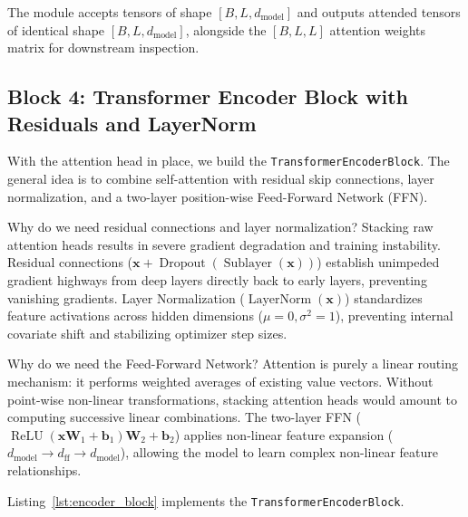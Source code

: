\documentclass[11pt,a4paper]{article}
\begin{document}
The module accepts tensors of shape $[B, L, d_{\text{model}}]$ and outputs attended tensors of identical shape $[B, L, d_{\text{model}}]$, alongside the $[B, L, L]$ attention weights matrix for downstream inspection.

\subsection{Block 4: Transformer Encoder Block with Residuals and LayerNorm}

With the attention head in place, we build the \texttt{TransformerEncoderBlock}. The general idea is to combine self-attention with residual skip connections, layer normalization, and a two-layer position-wise Feed-Forward Network (FFN).

Why do we need residual connections and layer normalization? Stacking raw attention heads results in severe gradient degradation and training instability. Residual connections ($\mathbf{x} + \operatorname{Dropout}(\operatorname{Sublayer}(\mathbf{x}))$) establish unimpeded gradient highways from deep layers directly back to early layers, preventing vanishing gradients. Layer Normalization ($\operatorname{LayerNorm}(\mathbf{x})$) standardizes feature activations across hidden dimensions ($\mu = 0, \sigma^2 = 1$), preventing internal covariate shift and stabilizing optimizer step sizes.

Why do we need the Feed-Forward Network? Attention is purely a linear routing mechanism: it performs weighted averages of existing value vectors. Without point-wise non-linear transformations, stacking attention heads would amount to computing successive linear combinations. The two-layer FFN ($\operatorname{ReLU}(\mathbf{x}\mathbf{W}_1 + \mathbf{b}_1)\mathbf{W}_2 + \mathbf{b}_2$) applies non-linear feature expansion ($d_{\text{model}} \to d_{\text{ff}} \to d_{\text{model}}$), allowing the model to learn complex non-linear feature relationships.

Listing~\ref{lst:encoder_block} implements the \texttt{TransformerEncoderBlock}.
\end{document}
